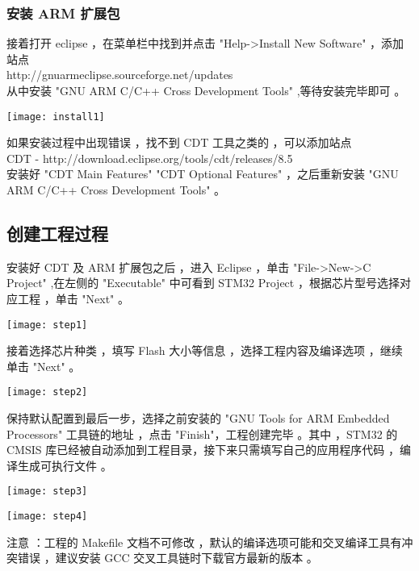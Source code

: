 \documentclass{article}
\begin{document}
\subsubsection{安装 ARM 扩展包}
\label{sec:arm扩展包}

接着打开 eclipse ，在菜单栏中找到并点击 "Help->Install New Software" ，添加站点 \\
http://gnuarmeclipse.sourceforge.net/updates \\
从中安装 "GNU ARM C/C++ Cross Development Tools" ,等待安装完毕即可 。

\begin{center}
  \texttt{[image: install1]}
\end{center}

如果安装过程中出现错误 ，找不到 CDT 工具之类的 ，可以添加站点 \\
CDT - http://download.eclipse.org/tools/cdt/releases/8.5 \\安装好 "CDT Main Features" "CDT Optional Features" ，之后重新安装 "GNU ARM C/C++ Cross Development Tools" 。


\subsection{创建工程过程}
\label{sec:创建工程过程}

安装好 CDT 及 ARM 扩展包之后 ，进入 Eclipse ，单击 "File->New->C Project" ,在左侧的 "Executable" 中可看到 STM32 Project ，根据芯片型号选择对应工程 ，单击 "Next" 。
\begin{center}
  \texttt{[image: step1]}
\end{center}

接着选择芯片种类 ，填写 Flash 大小等信息 ，选择工程内容及编译选项 ，继续单击 "Next" 。
\begin{center}
  \texttt{[image: step2]}
\end{center}


保持默认配置到最后一步，选择之前安装的 "GNU Tools for ARM Embedded Processors" 工具链的地址 ，点击 "Finish"，工程创建完毕 。其中 ，STM32 的 CMSIS 库已经被自动添加到工程目录，接下来只需填写自己的应用程序代码 ，编译生成可执行文件 。
\begin{center}
  \texttt{[image: step3]}
\end{center}
\begin{center}
  \texttt{[image: step4]}
\end{center}


注意 ：工程的 Makefile 文档不可修改 ，默认的编译选项可能和交叉编译工具有冲突错误 ，建议安装 GCC 交叉工具链时下载官方最新的版本 。
\end{document}
